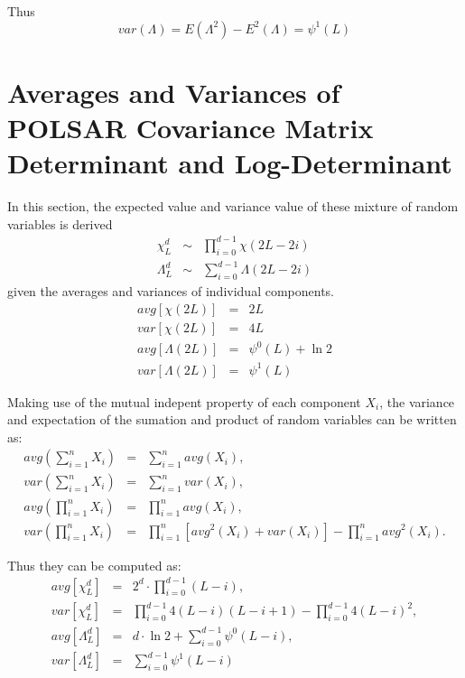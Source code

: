 Thus
\begin{equation}
var(\Lambda)=E(\Lambda^2)-E^2(\Lambda)=\psi^1(L)
\end{equation}

\section{Averages and Variances of POLSAR Covariance Matrix Determinant and Log-Determinant}

In this section, the expected value and variance value of these mixture of random variables is derived
\begin{eqnarray}
\chi^d_L &\sim& \prod_{i=0}^{d-1} \chi (2L-2i) \\
\Lambda^d_L &\sim& \sum_{i=0}^{d-1} \Lambda (2L-2i)
\end{eqnarray}
given the averages and variances of individual components.
\begin{eqnarray}
avg \left[ \chi(2L) \right]&=&2L \\
var \left[ \chi(2L) \right]&=&4L \\
avg \left[ \Lambda(2L) \right] &=& \psi^0(L) + \ln2 \\
var \left[ \Lambda(2L) \right] &=& \psi^1(L)
\end{eqnarray}

Making use of the mutual indepent property of each component $X_i$,
  the variance and expectation of the sumation and product of random variables can be written as:
\begin{eqnarray*}
avg \left( \sum^n_{i=1} X_i \right) &=& \sum^n_{i=1} avg(X_i), \\
var \left( \sum^n_{i=1} X_i \right) &=& \sum^n_{i=1} var(X_i), \\
avg \left( \prod^n_{i=1} X_i \right) &=& \prod^n_{i=1} avg(X_i), \\ 
var \left( \prod^n_{i=1} X_i \right) &=& \prod^n_{i=1} \left[ avg^2(X_i) + var(X_i) \right] - \prod^n_{i=1} avg^2(X_i).    
\end{eqnarray*}

Thus they can be computed as:
\begin{eqnarray*}
  avg \left[ \chi^d_L \right] &=& 2^d \cdot \prod^{d-1}_{i=0} (L-i), \\
  var \left[ \chi^d_L \right] &=& \prod^{d-1}_{i=0} 4(L-i)(L-i+1) - \prod^{d-1}_{i=0} 4(L-i)^2, \\
  avg \left[ \Lambda^d_L \right] &=& d \cdot \ln{2} + \sum^{d-1}_{i=0} \psi^0(L-i), \\
  var \left[ \Lambda^d_L \right] &=& \sum^{d-1}_{i=0} \psi^1(L-i)
\end{eqnarray*}


